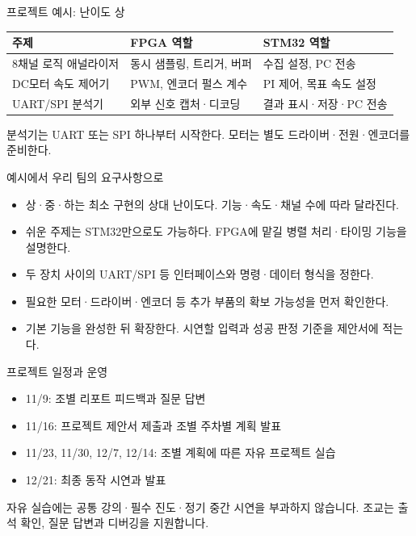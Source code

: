 \documentclass[aspectratio=169,11pt,t]{beamer}
\begin{document}
\begin{frame}{프로젝트 예시: 난이도 상}
\footnotesize
\setlength{\tabcolsep}{5pt}\renewcommand{\arraystretch}{1.65}
\begin{tabular}{@{}p{3.8cm}p{4.4cm}p{4.2cm}@{}}
\textbf{주제} & \textbf{FPGA 역할} & \textbf{STM32 역할}\\\hline
8채널 로직 애널라이저 & 동시 샘플링, 트리거, 버퍼 & 수집 설정, PC 전송\\
DC모터 속도 제어기 & PWM, 엔코더 펄스 계수 & PI 제어, 목표 속도 설정\\
UART/SPI 분석기 & 외부 신호 캡처·디코딩 & 결과 표시·저장·PC 전송\\
\end{tabular}
\par\vspace{0.4cm}\small
분석기는 UART 또는 SPI 하나부터 시작한다. 모터는 별도 드라이버·전원·엔코더를 준비한다.
\end{frame}

\begin{frame}{예시에서 우리 팀의 요구사항으로}
\begin{itemize}
\item 상·중·하는 최소 구현의 상대 난이도다. 기능·속도·채널 수에 따라 달라진다.
\item 쉬운 주제는 STM32만으로도 가능하다. FPGA에 맡길 병렬 처리·타이밍 기능을 설명한다.
\item 두 장치 사이의 UART/SPI 등 인터페이스와 명령·데이터 형식을 정한다.
\item 필요한 모터·드라이버·엔코더 등 추가 부품의 확보 가능성을 먼저 확인한다.
\item 기본 기능을 완성한 뒤 확장한다. 시연할 입력과 성공 판정 기준을 제안서에 적는다.
\end{itemize}
\end{frame}

\begin{frame}{프로젝트 일정과 운영}
\begin{itemize}
\item 11/9: 조별 리포트 피드백과 질문 답변
\item 11/16: 프로젝트 제안서 제출과 조별 주차별 계획 발표
\item 11/23, 11/30, 12/7, 12/14: 조별 계획에 따른 자유 프로젝트 실습
\item 12/21: 최종 동작 시연과 발표
\end{itemize}
\vspace{0.35cm}
자유 실습에는 공통 강의·필수 진도·정기 중간 시연을 부과하지 않습니다. 조교는 출석 확인, 질문 답변과 디버깅을 지원합니다.
\end{frame}
\end{document}
